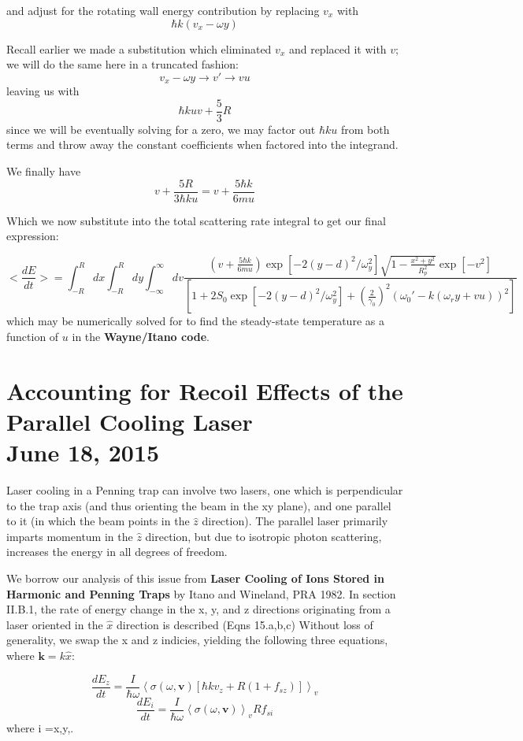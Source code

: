 \documentclass[11pt, oneside,reqno]{amsart}   	%
\newcommand{\eqn}[1]{\begin{equation}#1 \end{equation}}
\renewcommand{\vec}[1]{\textbf{#1}}
\begin{document}
  and adjust for the rotating wall energy contribution by replacing $v_x$ with
  \eqn{ \hbar k (v_x-\omega y)}
  
  Recall earlier we made a substitution which eliminated $v_x$ and replaced it with $v$; we will do the same here in a truncated fashion:
 \eqn{ v_x - \omega y \rightarrow v' \rightarrow vu }
 leaving us with 
 \eqn{ \hbar k uv + \frac{5}{3}R}
 since we will be eventually solving for a zero, we may factor out  $\hbar k u $ from both terms and throw away the constant coefficients when factored into the integrand.
 
 We finally have \eqn{ v + \frac{5R}{3\hbar k u} = v+ \frac{5\hbar k}{6m u}}
 
 Which we now substitute into the total scattering rate integral to get our final expression:

  \eqn{ 
 <\frac{dE}{dt}> = 
 \int_{-R}^{R} dx \int_{-R}^R  dy \int_{-\infty}^{\infty} dv 
 \frac{
 (v+ \frac{5\hbar k}{6m u})
 \exp [ -2 (y-d)^2/\omega_y^2] \sqrt{1-\frac{x^2+y^2}{R_p^2}} \exp [-v^2]
 }
 { \left[ 1+2S_0 \exp [ -2 (y-d)^2/\omega_y^2] +\left( \frac{2}{\gamma_0} \right)^2  (\omega_0' - k(\omega_r y +v u))^2 \right]}
 \label{dedt}
  }
  which may be numerically solved for to find the steady-state temperature as a function of $u$ in the \textbf{Wayne/Itano code}.

\newpage
\section{Accounting for Recoil Effects of the Parallel Cooling Laser \\ June 18, 2015}
Laser cooling in a Penning trap can involve two lasers, one which is perpendicular to the trap axis (and thus orienting the beam in the xy plane), and one parallel to it (in which the beam points in the $\hat{z}$ direction). The parallel laser primarily imparts momentum in the $\hat{z}$ direction, but due to isotropic photon scattering, increases the energy in all degrees of freedom.

We borrow our analysis of this issue from \textbf{Laser Cooling of Ions Stored in Harmonic and Penning Traps} by Itano and Wineland, PRA 1982.  In section II.B.1, the rate of energy change in the x, y, and z directions originating from a laser oriented in the $\hat{x}$ direction is described (Eqns 15.a,b,c) Without loss of generality, we swap the x and z indicies, yielding the following three equations, where $\vec{k}= k \hat{x}$:

\eqn{ \frac{dE_z}{dt} = \frac{I}{\hbar \omega} \left< \sigma (\omega, \vec{v}) [\hbar k v_z + R(1+f_{sz}) ]\right>_v \label{eqn:zheat}}
\eqn{\frac{dE_i}{dt} = \frac{I}{\hbar \omega} \left< \sigma (\omega, \vec{v}) \right>_v R f_{si} \label{eqn:xyheat}}
where i =x,y,.
\end{document}
